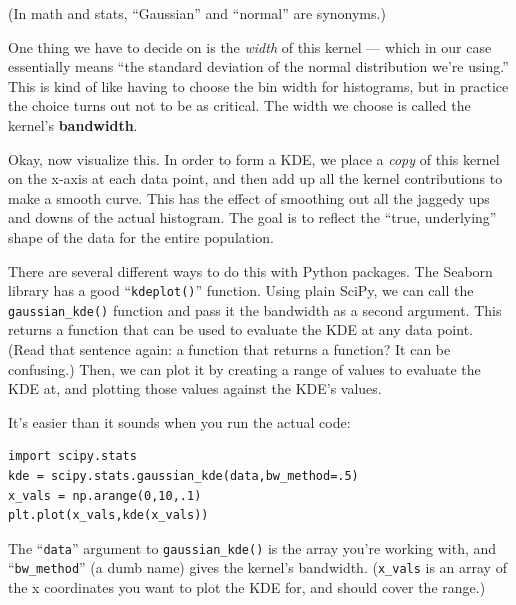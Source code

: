 (In math and stats, ``Gaussian'' and ``normal'' are synonyms.)


One thing we have to decide on is the \textit{width} of this kernel --- which
in our case essentially means ``the standard deviation of the normal
distribution we're using.'' This is kind of like having to choose the bin width
for histograms, but in practice the choice turns out not to be as critical. The
width we choose is called the kernel's \textbf{bandwidth}.

Okay, now visualize this. In order to form a KDE, we place a \textit{copy} of
this kernel on the x-axis at each data point, and then add up all the kernel
contributions to make a smooth curve. This has the effect of smoothing out all
the jaggedy ups and downs of the actual histogram. The goal is to reflect the
``true, underlying'' shape of the data for the entire population.


There are several different ways to do this with Python packages. The Seaborn
library has a good ``\texttt{kdeplot()}'' function. Using plain SciPy, we
can call the \texttt{gaussian\_kde()} function and pass it the bandwidth as a
second argument. This returns a function that can be used to evaluate the KDE
at any data point. (Read that sentence again: a function that returns a
function? It can be confusing.) Then, we can plot it by creating a range of
values to evaluate the KDE at, and plotting those values against the KDE's
values.

It's easier than it sounds when you run the actual code:


\begin{Verbatim}[fontsize=\footnotesize,samepage=true,frame=single,framesep=3mm]
import scipy.stats
kde = scipy.stats.gaussian_kde(data,bw_method=.5)
x_vals = np.arange(0,10,.1)
plt.plot(x_vals,kde(x_vals))
\end{Verbatim}


The ``\texttt{data}'' argument to \texttt{gaussian\_kde()} is the array you're
working with, and ``\texttt{bw\_method}'' (a dumb name) gives the kernel's
bandwidth. (\texttt{x\_vals} is an array of the x coordinates you want to plot
the KDE for, and should cover the range.)

